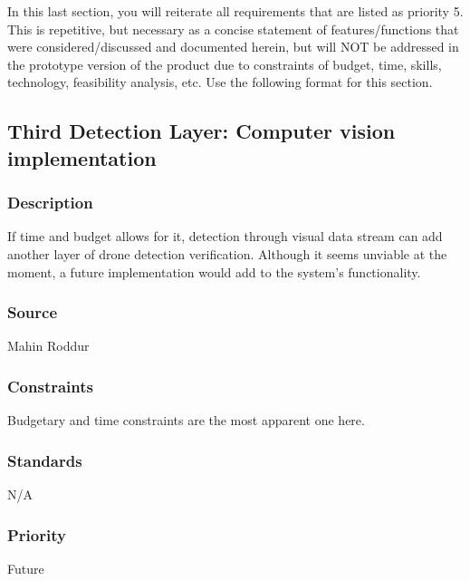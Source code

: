 In this last section, you will reiterate all requirements that are listed as priority 5. This is repetitive, but necessary as a concise statement of features/functions that were considered/discussed and documented herein, but will NOT be addressed in the prototype version of the product due to constraints of budget, time, skills, technology, feasibility analysis, etc. Use the following format for this section.

\subsection{Third Detection Layer: Computer vision implementation}
\subsubsection{Description}
If time and budget allows for it, detection through visual data stream can add another layer of drone detection verification. Although it seems unviable at the moment, a future implementation would add to the system's functionality.
\subsubsection{Source}
Mahin Roddur
\subsubsection{Constraints}
Budgetary and time constraints are the most apparent one here. 
\subsubsection{Standards}
N/A
\subsubsection{Priority}
Future
